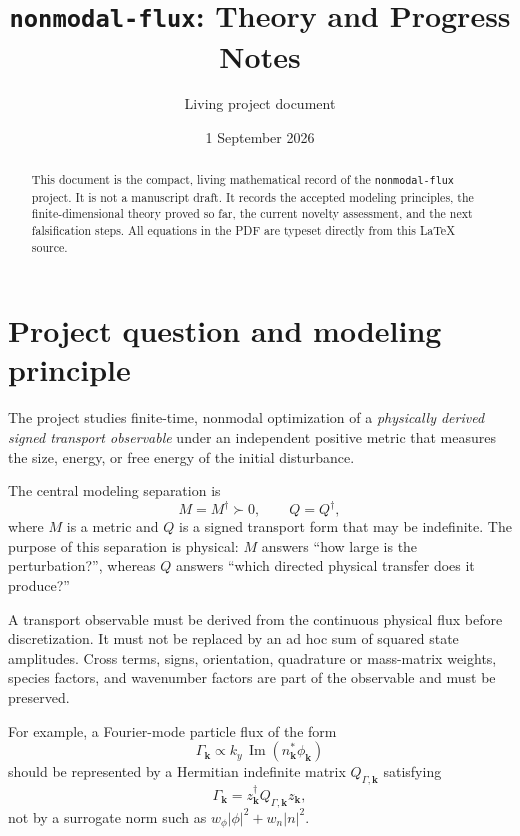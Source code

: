 \documentclass[11pt,a4paper]{article}
\title{\texttt{nonmodal-flux}: Theory and Progress Notes}
\author{Living project document}
\date{1 September 2026}
\begin{document}
\maketitle

\begin{abstract}
This document is the compact, living mathematical record of the \texttt{nonmodal-flux} project. It is not a manuscript draft. It records the accepted modeling principles, the finite-dimensional theory proved so far, the current novelty assessment, and the next falsification steps. All equations in the PDF are typeset directly from this \LaTeX{} source.
\end{abstract}

\tableofcontents
\bigskip

\section{Project question and modeling principle}

The project studies finite-time, nonmodal optimization of a \emph{physically derived signed transport observable} under an independent positive metric that measures the size, energy, or free energy of the initial disturbance.

The central modeling separation is
\begin{equation}
  M=M^\dagger \succ 0,
  \qquad
  Q=Q^\dagger,
\end{equation}
where $M$ is a metric and $Q$ is a signed transport form that may be indefinite. The purpose of this separation is physical: $M$ answers ``how large is the perturbation?'', whereas $Q$ answers ``which directed physical transfer does it produce?''

A transport observable must be derived from the continuous physical flux before discretization. It must not be replaced by an ad hoc sum of squared state amplitudes. Cross terms, signs, orientation, quadrature or mass-matrix weights, species factors, and wavenumber factors are part of the observable and must be preserved.

For example, a Fourier-mode particle flux of the form
\begin{equation}
  \Gamma_{\bm{k}}
  \propto k_y\,\operatorname{Im}\!\left(n_{\bm{k}}^*\phi_{\bm{k}}\right)
\end{equation}
should be represented by a Hermitian indefinite matrix $Q_{\Gamma,\bm{k}}$ satisfying
\begin{equation}
  \Gamma_{\bm{k}} = z_{\bm{k}}^\dagger Q_{\Gamma,\bm{k}} z_{\bm{k}},
\end{equation}
not by a surrogate norm such as $w_\phi |\phi|^2+w_n|n|^2$.
\end{document}
